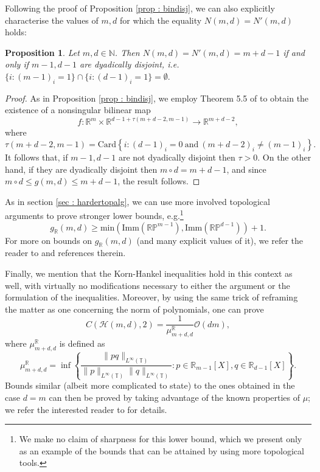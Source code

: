 \documentclass[11pt, a4paper, reqno]{elsarticle}
\newtheorem{proposition}{Proposition}[section]
\theoremstyle{definition}
\theoremstyle{remark}
\begin{document}
Following the
proof of Proposition \ref{prop : bindisj}, we can also explicitly
characterise the values of $m,d$ for which the equality $N(m,d)=N'(m,d)$ holds:
\begin{proposition}
    Let $m,d\in \mathbb{N}$. Then $N(m,d)=N'(m,d)=m+d-1$ if and only if
    $m-1,d-1$ are dyadically disjoint,
    i.e. $\{i\colon (m-1)_i=1\}\cap \{i\colon  (d-1)_i=1\}=\emptyset.$
\end{proposition}
\begin{proof}
    As in Proposition \ref{prop : bindisj}, we employ Theorem 5.5
    of \cite{lam1968construction}
    to obtain the existence
    of a nonsingular bilinear map
    \begin{equation*}
        f\colon \mathbb{R}^m\times \mathbb{R}^{d-1+\tau(m+d-2,m-1)}\to \mathbb{R}^{m+d-2},
    \end{equation*}
    where
    \begin{equation*}
        \tau(m+d-2,m-1)=\mathrm{Card}
        \left\{i\colon  (d-1)_i=0\ \mathrm{and}\ (m+d-2)_i\neq (m-1)_i\right\}.
    \end{equation*}
    It follows that, if $m-1,d-1$
    are not dyadically disjoint then $\tau>0$. On the other hand, if
    they are dyadically disjoint then
    $m\circ d=m+d-1$, and since $m\circ d\le g(m,d)\le m+d-1$, the result follows.
\end{proof}

\par
As in section \ref{sec : hardertopalg},
we can use more
involved topological arguments to prove stronger lower bounds, e.g.\footnote{We make no claim 
of sharpness for this lower bound, which we
present only as an example of the bounds that can be attained by using more topological tools.}
\begin{equation*}
    g_{\mathbb R}(m,d)\ge \mathrm{min}\left(\mathrm{Imm}(\mathbb{R}\mathbb P^{m-1}), \mathrm{Imm}(\mathbb{R}\mathbb P^{d-1})\right)+1.
\end{equation*}
For more on bounds on $g_{\mathbb R}(m,d)$ (and many explicit
values of it), we refer the reader
to \cite{DominguezLam2021} and references
therein. \par
Finally, we mention that the 
 Korn-Hankel inequalities hold in this context 
 as well, with virtually no modifications
 necessary to either the argument or the formulation of the inequalities. Moreover,
 by using the same trick of reframing
 the matter as one concerning the norm
 of polynomials, one can prove
 \begin{equation*}
      C(\mathcal H(m,d),2)
      =\frac1{\mu_{m+d,d}^{\mathbb R}}\mathcal O(dm),
 \end{equation*}
 where $\mu_{m+d,d}^{\mathbb R}$ is defined
 as
 \begin{equation*}
     \mu_{m+d,d}^{\mathbb R}
     =\inf\left\{\frac{\|pq\|_{L^\infty(\mathbb{T})}}{\|p\|_{L^\infty(\mathbb{T})}\|q\|_{L^\infty(\mathbb{T})}}\colon  
     p\in \mathbb{R}_{m-1}[X], q\in \mathbb{R}_{d-1}[X]\right\}.
 \end{equation*}
 Bounds similar (albeit more complicated
 to state) to the ones obtained
 in the case $d=m$ can then be proved by 
 taking advantage of the known 
 properties of $\mu$; we refer the 
 interested reader to \cite{burger}
 for details.
\end{document}
